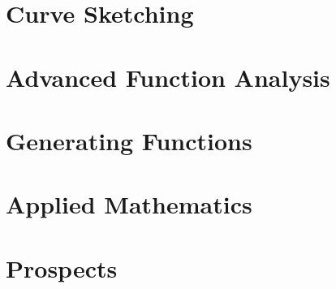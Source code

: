 \documentclass{scrbook}
\begin{document}
\chapter{Curve Sketching} %
\chapter{Advanced Function Analysis} %
\chapter{Generating Functions} %
\chapter{Applied Mathematics} %
\chapter{Prospects} %
\end{document}
